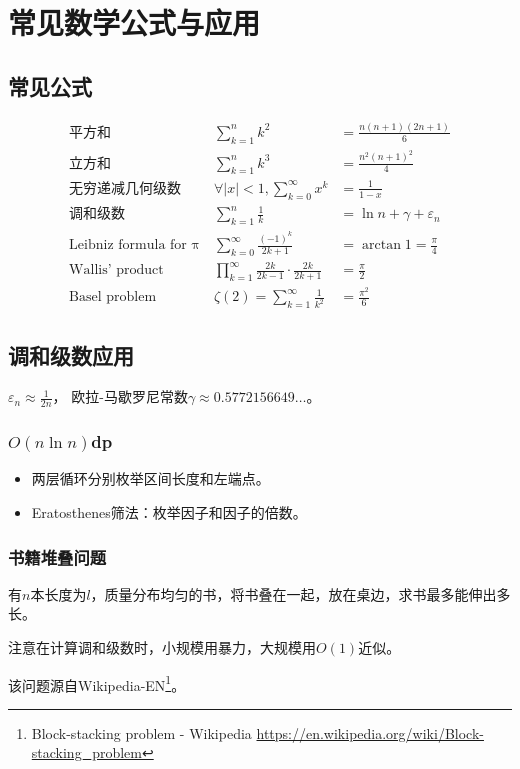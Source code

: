 \section{常见数学公式与应用}
\subsection{常见公式}
\begin{eqnarray*}
    \textrm{平方和}&~\sum_{k=1}^n{k^2}&=\frac{n(n+1)(2n+1)}{6}\\
    \textrm{立方和}&~\sum_{k=1}^n{k^3}&=\frac{n^2(n+1)^2}{4}\\
    \textrm{无穷递减几何级数}&~\forall |x|<1,\sum_{k=0}^\infty{x^k}
    &=\frac{1}{1-x}\\
    \textrm{调和级数}&~\sum_{k=1}^n{\frac{1}{k}}&=\ln n+\gamma+\varepsilon_n\\
    \textrm{Leibniz formula for π}&~\sum_{k=0}^\infty{\frac{(-1)^k}{2k+1}}
    &=\arctan 1=\frac{\pi}{4}\\
    \textrm{Wallis' product}&~\prod_{k=1}^\infty{\frac{2k}{2k-1}
    \cdot\frac{2k}{2k+1}}&=\frac{\pi}{2}\\
    \textrm{Basel problem}&~\zeta(2)=\sum_{k=1}^\infty{\frac{1}{k^2}}
    &=\frac{\pi^2}{6}
\end{eqnarray*}
\subsection{调和级数应用}
$\varepsilon_n\approx\frac{1}{2n}$，
欧拉-马歇罗尼常数$\gamma\approx 0.5772156649\ldots$。
\subsubsection{$O(n\ln n)$dp}
\begin{itemize}
    \item 两层循环分别枚举区间长度和左端点。
    \item Eratosthenes筛法：枚举因子和因子的倍数。
\end{itemize}
\subsubsection{书籍堆叠问题}
有$n$本长度为$l$，质量分布均匀的书，将书叠在一起，放在桌边，求书最多能伸出多长。


注意在计算调和级数时，小规模用暴力，大规模用$O(1)$近似。

该问题源自Wikipedia-EN\footnote{Block-stacking problem - Wikipedia
\url{https://en.wikipedia.org/wiki/Block-stacking\_problem}}。
